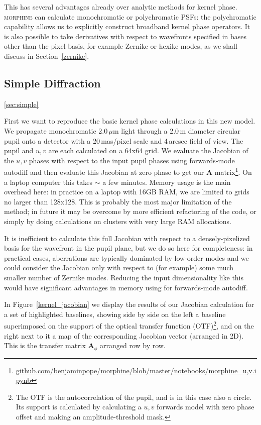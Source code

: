 \documentclass[modern]{aastex63}
\begin{document}
This has several advantages already over analytic methods for kernel phase. \textsc{morphine} can calculate monochromatic or polychromatic PSFs: the polychromatic capability allows us to explicitly construct broadband kernel phase operators. It is also possible to take derivatives with respect to wavefronts specified in bases other than the pixel basis, for example Zernike or hexike modes, as we shall discuss in Section~\ref{zernike}.

\subsection{Simple Diffraction}
\ref{sec:simple}

First we want to reproduce the basic kernel phase calculations in this new model. We propagate monochromatic 2.0\,$\mu$m light through a 2.0\,m diameter circular pupil onto a detector with a 20\,mas/pixel scale and 4\,arcsec field of view. The pupil and $u,v$ are each calculated on a 64x64 grid. We evaluate the Jacobian of the $u,v$ phases with respect to the input pupil phases using forwards-mode autodiff and then evaluate this Jacobian at zero phase to get our $\mathbf{A}$ matrix\footnote{\href{https://github.com/benjaminpope/morphine/blob/master/notebooks/morphine_u,v.ipynb}{github.com/benjaminpope/morphine/blob/master/notebooks/morphine\_u,v.ipynb}}. On a laptop computer this takes $\sim$ a few minutes. Memory usage is the main overhead here: in practice on a laptop with 16GB RAM, we are limited to grids no larger than 128x128. This is probably the most major limitation of the method; in future it may be overcome by more efficient refactoring of the code, or simply by doing calculations on clusters with very large RAM allocations.

It is inefficient to calculate this full Jacobian with respect to a densely-pixelized basis for the wavefront in the pupil plane, but we do so here for completeness: in practical cases, aberrations are typically dominated by low-order modes and we could consider the Jacobian only with respect to (for example) some much smaller number of Zernike modes. Reducing the input dimensionality like this would have significant advantages in memory using for forwards-mode autodiff.

In Figure~\ref{kernel_jacobian} we display the results of our Jacobian calculation for a set of highlighted baselines, showing side by side on the left a baseline superimposed on the support of the optical transfer function (OTF)\footnote{The OTF is the autocorrelation of the pupil, and is in this case also a circle. Its support is calculated by calculating a $u,v$ forwards model with zero phase offset and making an amplitude-threshold mask.}, and on the right next to it a map of the corresponding Jacobian vector (arranged in 2D). This is the transfer matrix $\mathbf{A}_\phi$ arranged row by row.  
\end{document}
